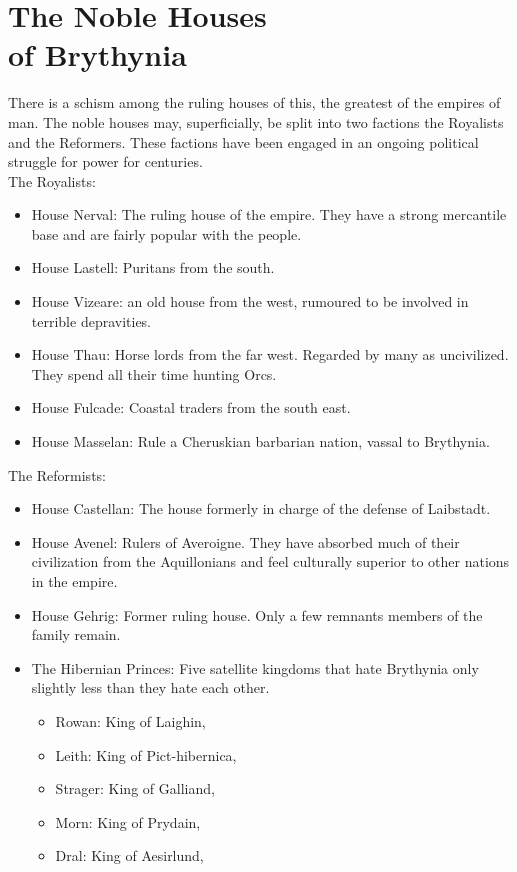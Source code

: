 \documentclass[a4paper]{dnd5}
\begin{document}
\section{The Noble Houses \\ of Brythynia}

There is a schism among the ruling houses of this, the greatest of the empires of man.  
The noble houses may, superficially, be split into two factions the Royalists and the 
Reformers.  These factions have been engaged in an ongoing political struggle for power
for centuries. \\

The Royalists:
\begin{itemize}
  \item House Nerval: The ruling house of the empire.  They have a strong mercantile base and are fairly popular with the people.
  \item House Lastell: Puritans from the south.
  \item House Vizeare: an old house from the west, rumoured to be involved in terrible depravities.
  \item House Thau: Horse lords from the far west.  Regarded by many as uncivilized. They spend all their time hunting Orcs.  
  \item House Fulcade: Coastal traders from the south east.
  \item House Masselan: Rule a Cheruskian barbarian nation, vassal to Brythynia.
\end{itemize}

\vspace{1em}
The Reformists:
\begin{itemize}
  \item House Castellan: The house formerly in charge of the defense of Laibstadt.
  \item House Avenel: Rulers of Averoigne.  They have absorbed much of their civilization from the Aquillonians and feel culturally superior to other nations in the empire.
  \item House Gehrig: Former ruling house.  Only a few remnants members of the family remain.
  \item The Hibernian Princes: Five satellite kingdoms that hate Brythynia only slightly less than they hate each other.
    \begin{itemize}
      \item Rowan: King of Laighin,
      \item Leith: King of Pict-hibernica,
      \item Strager: King of Galliand, 
      \item Morn: King of Prydain,
      \item Dral: King of Aesirlund,
    \end{itemize}
\end{itemize}
\end{document}

